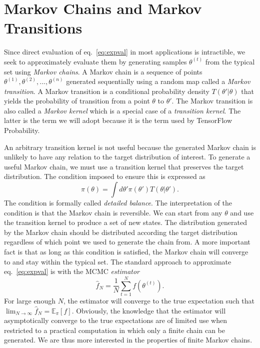 \section{Markov Chains and Markov Transitions}
Since direct evaluation of eq.~\eqref{eq:expval} in most applications is intractible, we seek to approximately evaluate them
by generating samples $\theta^{(t)}$ from the typical set using \textit{Markov chains}. A Markov chain is a sequence of points $\theta^{(1)}, \theta^{(2)}, ..., \theta^{(n)}$ generated sequentially
using a random map called a \textit{Markov transition}. A Markov transition is a conditional probability density
$T(\theta'|\theta)$ that yields the probability of transition from a point $\theta$ to $\theta'$. The Markov transition is also called
a \textit{Markov kernel} which is a special case of a \textit{transition kernel}. The latter is the term we will adopt because it
is the term used by TensorFlow Probability.

An arbitrary transition kernel is not useful because the generated Markov chain is unlikely to have any relation to the target distribution
of interest. To generate a useful Markov chain, we must use a transition kernel that preserves the target distribution. 
The condition imposed to ensure this is expressed as
\begin{equation}\label{eq:detailed_balance}
    \pi(\theta) = \int d\theta' \pi(\theta')T(\theta|\theta').
\end{equation}
The condition is formally called \textit{detailed balance}. The interpretation of the condition is that the Markov chain is reversible.
We can start from any $\theta$ and use the transition kernel to produce a set of new states. The distribution generated by the Markov chain
should be distributed according the target distribution regardless of which point we used to generate the chain from. A more important
fact is that as long as this condition is satisfied, the Markov chain will converge to and stay within the typical set.
The standard approach to approximate eq.~\eqref{eq:expval} is with the MCMC \textit{estimator}
\begin{equation}
    \hat{f}_N = \frac{1}{N}\sum_{t=1}^N f(\theta^{(t)}).
\end{equation}
For large enough $N$, the estimator will converge to the true expectation such that $\lim_{N\to\infty} \hat{f}_N = \mathbb{E}_\pi[f]$.
Obviously, the knowledge that the estimator will asymptotically converge to the true expectations are of limited use
when restricted to a practical computation in which only a finite chain can be generated. 
We are thus more interested in the properties of finite Markov chains.

